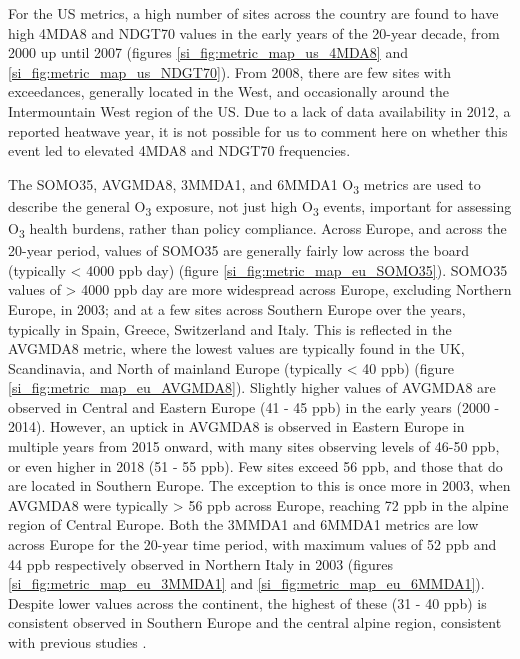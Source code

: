 \documentclass[journal abbreviation, manuscript]{copernicus}
\begin{document}
For the US metrics, a high number of sites across the country are found to have high 4MDA8 and NDGT70 values in the early years of the 20-year decade, from 2000 up until 2007 (figures \ref{si_fig:metric_map_us_4MDA8} and \ref{si_fig:metric_map_us_NDGT70}). From 2008, there are few sites with exceedances, generally located in the West, and occasionally around the Intermountain West region of the US. Due to a lack of data availability in 2012, a reported heatwave year, it is not possible for us to comment here on whether this event led to elevated 4MDA8 and NDGT70 frequencies. 

The SOMO35, AVGMDA8, 3MMDA1, and 6MMDA1 O\textsubscript{3} metrics are used to describe the general O\textsubscript{3} exposure, not just high O\textsubscript{3} events, important for assessing O\textsubscript{3} health burdens, rather than policy compliance. Across Europe, and across the 20-year period, values of SOMO35 are generally fairly low across the board (typically < 4000 ppb day) (figure \ref{si_fig:metric_map_eu_SOMO35}). SOMO35 values of > 4000 ppb day are more widespread across Europe, excluding Northern Europe, in 2003; and at a few sites across Southern Europe over the years, typically in Spain, Greece, Switzerland and Italy. This is reflected in the AVGMDA8 metric, where the lowest values are typically found in the UK, Scandinavia, and North of mainland Europe (typically < 40 ppb) (figure \ref{si_fig:metric_map_eu_AVGMDA8}). Slightly higher values of AVGMDA8 are observed in Central and Eastern Europe (41 - 45 ppb) in the early years (2000 - 2014). However, an uptick in AVGMDA8 is observed in Eastern Europe in multiple years from 2015 onward, with many sites observing levels of 46-50 ppb, or even higher in 2018 (51 - 55 ppb). Few sites exceed 56 ppb, and those that do are located in Southern Europe. The exception to this is once more in 2003, when AVGMDA8 were typically > 56 ppb across Europe, reaching 72 ppb in the alpine region of Central Europe. Both the 3MMDA1 and 6MMDA1 metrics are low across Europe for the 20-year time period, with maximum values of 52 ppb and 44 ppb respectively observed in Northern Italy in 2003 (figures \ref{si_fig:metric_map_eu_3MMDA1} and \ref{si_fig:metric_map_eu_6MMDA1}). Despite lower values across the continent, the highest of these (31 - 40 ppb) is consistent observed in Southern Europe and the central alpine region, consistent with previous studies \citep{WangKeding2024}.
\end{document}
